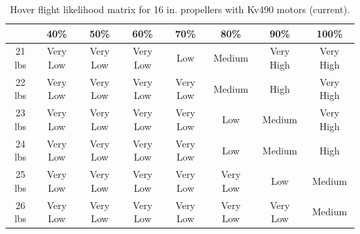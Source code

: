 \documentclass{article}
\begin{document}
\begin{table}[h]
    \centering
    \begin{tabular}{|c|c|c|c|c|c|c|c|}
        \hline
 & 40\% & 50\% & 60\% & 70\% & 80\% & 90\% & 100\%  \\
        \hline
        21 lbs & \cellcolor{red!80} Very Low & \cellcolor{red!80} Very Low & \cellcolor{red!80} Very Low & \cellcolor{red!20} Low & \cellcolor{yellow!60} Medium & \cellcolor{ForestGreen!80} Very High & \cellcolor{ForestGreen!80} Very High \\
        \hline
        22 lbs & \cellcolor{red!80} Very Low & \cellcolor{red!80} Very Low & \cellcolor{red!80} Very Low & \cellcolor{red!80} Very Low & \cellcolor{yellow!60} Medium & \cellcolor{ForestGreen!40} High & \cellcolor{ForestGreen!80} Very High \\
        \hline
        23 lbs & \cellcolor{red!80} Very Low & \cellcolor{red!80} Very Low & \cellcolor{red!80} Very Low & \cellcolor{red!80} Very Low & \cellcolor{red!20} Low & \cellcolor{yellow!60} Medium & \cellcolor{ForestGreen!80} Very High \\
        \hline
        24 lbs & \cellcolor{red!80} Very Low & \cellcolor{red!80} Very Low & \cellcolor{red!80} Very Low & \cellcolor{red!80} Very Low & \cellcolor{red!20} Low & \cellcolor{yellow!60} Medium & \cellcolor{ForestGreen!40} High \\
        \hline
        25 lbs & \cellcolor{red!80} Very Low & \cellcolor{red!80} Very Low & \cellcolor{red!80} Very Low & \cellcolor{red!80} Very Low & \cellcolor{red!80} Very Low & \cellcolor{red!20} Low & \cellcolor{yellow!60} Medium \\
        \hline
        26 lbs & \cellcolor{red!80} Very Low & \cellcolor{red!80} Very Low & \cellcolor{red!80} Very Low & \cellcolor{red!80} Very Low & \cellcolor{red!80} Very Low & \cellcolor{red!80} Very Low & \cellcolor{yellow!60} Medium \\
        \hline
    \end{tabular}
    \caption{Hover flight likelihood matrix for 16 in. propellers with Kv490 motors (current).}
    \label{tab:hover_likelihood_matrix_16}
\end{table}
\end{document}
